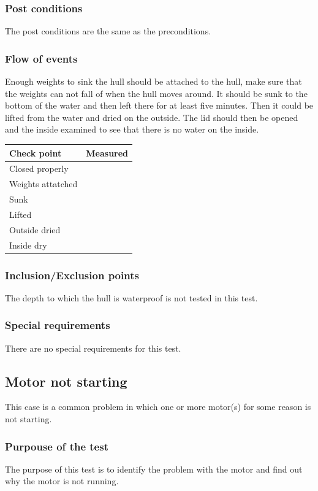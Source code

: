 \subsubsection*{Post conditions}
The post conditions are the same as the preconditions. 
\subsubsection*{Flow of events}
Enough weights to sink the hull should be attached to the hull, make sure that the weights can not fall of when the hull moves around. It should be sunk to the bottom of the water and then left there for at least five minutes. Then it could be lifted from the water and dried on the outside. The lid should then be opened and the inside examined to see that there is no water on the inside. 

\begin{tabular}{| l | c |}
\hline
Check point & Measured \\ \hline
Closed properly &  \\ \hline
Weights attatched &  \\ \hline
Sunk & \\ \hline
Lifted & \\ \hline
Outside dried & \\ \hline
Inside dry & \\ \hline
\end{tabular}
\subsubsection*{Inclusion/Exclusion points}
The depth to which the hull is waterproof is not tested in this test. 
\subsubsection*{Special requirements}
There are no special requirements for this test. 

\subsection{Motor not starting}
This case is a common problem in which one or more motor(s) for some reason is not starting.
\subsubsection*{Purpouse of the test}
The purpose of this test is to identify the problem with the motor and find out why the motor is not running. 
